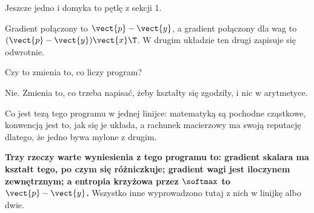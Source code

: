 \begin{fr}
Jeszcze jedno i domyka to pętlę z sekcji 1.

Gradient połączony to $\vect{p} - \vect{y}$, a gradient połączony dla wag to
$(\vect{p} - \vect{y})\vect{x}\T$. W drugim układzie ten drugi zapisuje się
odwrotnie.

Czy to zmienia to, co liczy program?
\dotline
\nextframe
\end{fr}

\begin{fr}
\begin{ansblock}
Nie. Zmienia to, co trzeba napisać, żeby kształty się zgodziły, i nic w
arytmetyce.
\end{ansblock}

Co jest tezą tego programu w jednej linijce: matematyką są pochodne
cząstkowe, konwencją jest to, jak się je układa, a rachunek macierzowy ma
swoją reputację dlatego, że jedno bywa mylone z drugim.

\textbf{Trzy rzeczy warte wyniesienia z tego programu to: gradient skalara ma
kształt tego, po czym się różniczkuje; gradient wagi jest iloczynem
zewnętrznym; a entropia krzyżowa przez $\softmax$ to $\vect{p} - \vect{y}$.}
Wszystko inne wyprowadzono tutaj z nich w linijkę albo dwie.
\end{fr}

